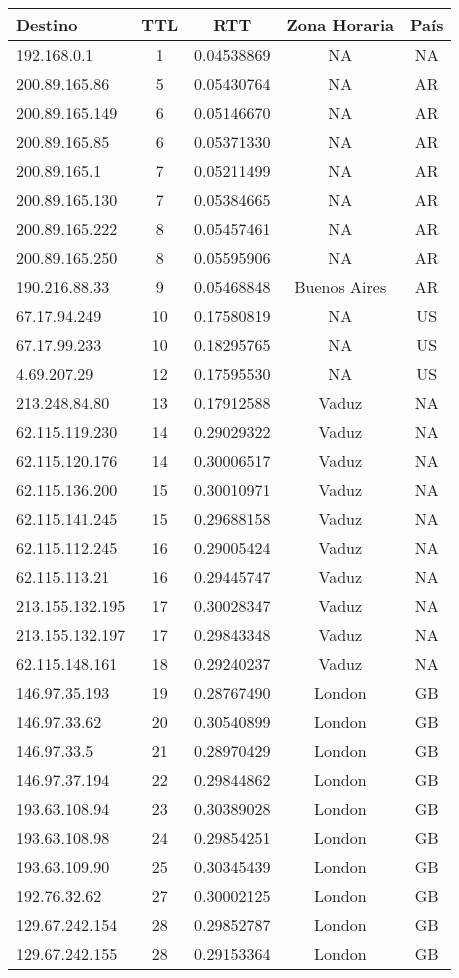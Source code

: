 \begin{center}
\begin{tabular}{lcccc}
Destino & TTL & RTT & Zona Horaria & País\\
\hline
192.168.0.1 & 1 & 0.04538869 & NA & NA\\
200.89.165.86 & 5 & 0.05430764 & NA & AR\\
200.89.165.149 & 6 & 0.05146670 & NA & AR\\
200.89.165.85 & 6 & 0.05371330 & NA & AR\\
200.89.165.1 & 7 & 0.05211499 & NA & AR\\
200.89.165.130 & 7 & 0.05384665 & NA & AR\\
200.89.165.222 & 8 & 0.05457461 & NA & AR\\
200.89.165.250 & 8 & 0.05595906 & NA & AR\\
190.216.88.33 & 9 & 0.05468848 & Buenos Aires & AR\\
67.17.94.249 & 10 & 0.17580819 & NA & US\\
67.17.99.233 & 10 & 0.18295765 & NA & US\\
4.69.207.29 & 12 & 0.17595530 & NA & US\\
213.248.84.80 & 13 & 0.17912588 & Vaduz & NA\\
62.115.119.230 & 14 & 0.29029322 & Vaduz & NA\\
62.115.120.176 & 14 & 0.30006517 & Vaduz & NA\\
62.115.136.200 & 15 & 0.30010971 & Vaduz & NA\\
62.115.141.245 & 15 & 0.29688158 & Vaduz & NA\\
62.115.112.245 & 16 & 0.29005424 & Vaduz & NA\\
62.115.113.21 & 16 & 0.29445747 & Vaduz & NA\\
213.155.132.195 & 17 & 0.30028347 & Vaduz & NA\\
213.155.132.197 & 17 & 0.29843348 & Vaduz & NA\\
62.115.148.161 & 18 & 0.29240237 & Vaduz & NA\\
146.97.35.193 & 19 & 0.28767490 & London & GB\\
146.97.33.62 & 20 & 0.30540899 & London & GB\\
146.97.33.5 & 21 & 0.28970429 & London & GB\\
146.97.37.194 & 22 & 0.29844862 & London & GB\\
193.63.108.94 & 23 & 0.30389028 & London & GB\\
193.63.108.98 & 24 & 0.29854251 & London & GB\\
193.63.109.90 & 25 & 0.30345439 & London & GB\\
192.76.32.62 & 27 & 0.30002125 & London & GB\\
129.67.242.154 & 28 & 0.29852787 & London & GB\\
129.67.242.155 & 28 & 0.29153364 & London & GB\\
\end{tabular}
\end{center}
